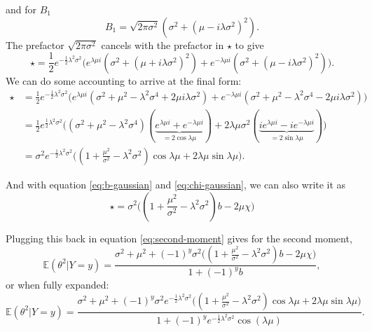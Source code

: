 \documentclass[]{report}
\begin{document}
and for $B_1$
\begin{equation}
    B_1 = \sqrt{2\pi\sigma^2} (\sigma^2 + (\mu - i \lambda \sigma^2)^2).
\end{equation}
The prefactor $\sqrt{2\pi\sigma^2}$ cancels with the prefactor in $\star$ to give
\begin{equation}
    \star = \frac{1}{2}e^{-\frac{1}{2}\lambda^2\sigma^2}
    \Big(
        e^{\lambda \mu i}(\sigma^2 + (\mu + i \lambda \sigma^2)^2) +
        e^{-\lambda \mu i}(\sigma^2 + (\mu - i \lambda \sigma^2)^2)
    \Big).
\end{equation}
We can do some accounting to arrive at the final form:
\begin{align}
    \star &= \frac{1}{2}e^{-\frac{1}{2}\lambda^2\sigma^2}
    \Big(
        e^{\lambda \mu i}(\sigma^2 + \mu^2 - \lambda^2\sigma^4 + 2\mu i \lambda \sigma^2) +
        e^{-\lambda \mu i}(\sigma^2 + \mu^2 - \lambda^2\sigma^4 - 2\mu i \lambda \sigma^2)
    \Big)\\
    &= \frac{1}{2}e^{\frac{1}{2}\lambda^2\sigma^2}
    \Big(
        (\sigma^2 + \mu^2 - \lambda^2\sigma^4)(\underbrace{e^{\lambda \mu i} + e^{-\lambda \mu i}}_{=2\cos{\lambda \mu}})
        + 2\lambda \mu \sigma^2(\underbrace{i e^{\lambda \mu i} - ie^{-\lambda \mu i}}_{=2\sin{\lambda \mu}})
    \Big)\\
    &= \sigma^2 e^{-\frac{1}{2}\lambda^2\sigma^2}\Big((1 + \frac{\mu^2}{\sigma^2} - \lambda^2\sigma^2)\cos{\lambda \mu} + 2\lambda \mu \sin{\lambda \mu}\Big).
\end{align}

And with equation \eqref{eq:b-gaussian} and \eqref{eq:chi-gaussian}, we can also write it as
\begin{equation}
    \star = \sigma^2\Big( (1 + \frac{\mu^2}{\sigma^2} - \lambda^2\sigma^2)b -2\mu \chi\Big)
\end{equation}

Plugging this back in equation \eqref{eq:second-moment} gives for the second moment,
\begin{equation}
    \mathbb{E}(\theta^2 | Y=y) = \frac{\sigma^2 + \mu^2+ (-1)^y \sigma^2\Big( (1 + \frac{\mu^2}{\sigma^2} - \lambda^2\sigma^2)b -2\mu \chi\Big)}{1+(-1)^yb},
\end{equation}
or when fully expanded:
\begin{equation}
    \mathbb{E}(\theta^2 | Y=y) = \frac{\sigma^2 + \mu^2+ (-1)^y \sigma^2 e^{-\frac{1}{2}\lambda^2\sigma^2}\Big((1 + \frac{\mu^2}{\sigma^2} - \lambda^2\sigma^2)\cos{\lambda \mu} + 2\lambda \mu \sin{\lambda \mu}\Big)}{1+(-1)^ye^{-\frac{1}{2}\lambda^2\sigma^2}\cos(\lambda\mu)}.
\end{equation}
\end{document}
